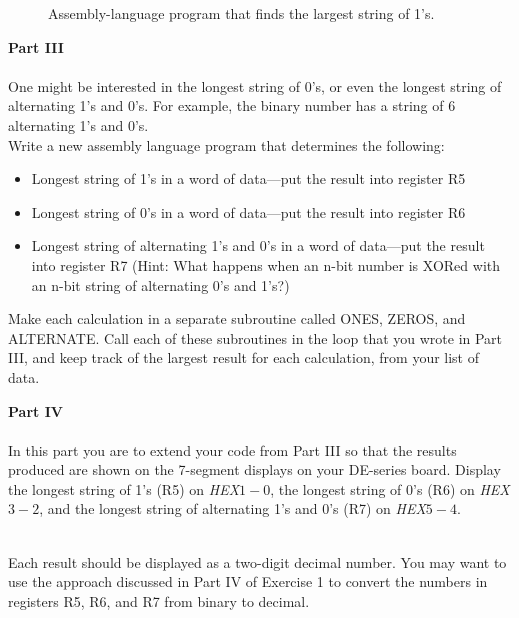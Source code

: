 \documentclass[epsfig,10pt,fullpage]{article}
\begin{document}
\begin{figure}[H]
\begin{center}

\end{center}
\caption{Assembly-language program that finds the largest string of 1's.}
\label{fig:code}
\end{figure}

\noindent
{\bf Part III}
~\\
~\\
\noindent
One might be interested in the longest string of 0's, or even the longest string of
alternating 1's and 0's. For example, the binary number {} has a string of 
6 alternating 1's and 0's.
~\\

\noindent Write a new assembly language program that determines the following:
\begin{itemize}
\item Longest string of 1's in a word of data---put the result into register R5
\item Longest string of 0's in a word of data---put the result into register R6
\item Longest string of alternating 1's and 0's in a word of data---put the result into 
register R7
(Hint: What happens when an n-bit number is XORed with an n-bit string of alternating 0's and 1's?)
\end{itemize}
Make each calculation in a separate subroutine called ONES, ZEROS, and ALTERNATE. Call
each of these subroutines in the loop that you wrote in Part III, and keep track of the
largest result for each calculation, from your list of data.

\newpage
\noindent
{\bf Part IV}
~\\
~\\
\noindent
In this part you are to extend your code from Part III so that the results produced are
shown on the 7-segment displays on your DE-series board. Display the longest string of 1's
(R5) on {\it HEX}$1-0$, the longest string of 0's (R6) on {\it HEX}$3-2$, and 
the longest string of alternating 1's and 0's (R7) on {\it HEX}$5-4$.  

~\\
\noindent
Each result should be displayed as a two-digit decimal number. You may want to use the approach
discussed in Part IV of Exercise 1 to convert the numbers in registers R5, R6, and R7 from
binary to decimal.  
\end{document}
